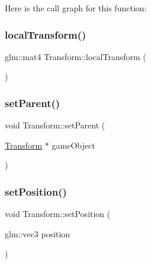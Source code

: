 Here is the call graph for this function\+:
\hypertarget{class_mason_1_1_transform_a8b85abc03488f58bef8bb78df77c1689}{}\label{class_mason_1_1_transform_a8b85abc03488f58bef8bb78df77c1689} 
\subsubsection{\texorpdfstring{local\+Transform()}{localTransform()}}
{\footnotesize\ttfamily glm\+::mat4 Transform\+::local\+Transform (\begin{DoxyParamCaption}{ }\end{DoxyParamCaption})}

\hypertarget{class_mason_1_1_transform_a6e1a6b57214a7de21595e6af8b05138b}{}\label{class_mason_1_1_transform_a6e1a6b57214a7de21595e6af8b05138b} 
\subsubsection{\texorpdfstring{set\+Parent()}{setParent()}}
{\footnotesize\ttfamily void Transform\+::set\+Parent (\begin{DoxyParamCaption}\item[{\hyperlink{class_mason_1_1_transform}{Transform} $\ast$}]{game\+Object }\end{DoxyParamCaption})\hspace{0.3cm}{\ttfamily [virtual]}}

\hypertarget{class_mason_1_1_transform_a740f389e20c0190c52bcb893aeaa0490}{}\label{class_mason_1_1_transform_a740f389e20c0190c52bcb893aeaa0490} 
\subsubsection{\texorpdfstring{set\+Position()}{setPosition()}}
{\footnotesize\ttfamily void Transform\+::set\+Position (\begin{DoxyParamCaption}\item[{glm\+::vec3}]{position }\end{DoxyParamCaption})\hspace{0.3cm}{\ttfamily [virtual]}}



